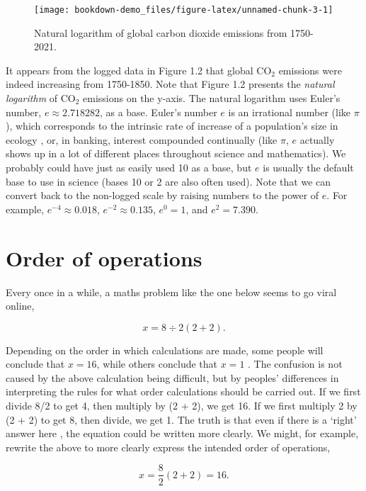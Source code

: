 \documentclass[
]{scrbook}
\begin{document}
\begin{figure}
\texttt{[image: bookdown-demo\_files/figure-latex/unnamed-chunk-3-1]} \caption{Natural logarithm of global carbon dioxide emissions from 1750-2021.}\label{fig:unnamed-chunk-3}
\end{figure}

It appears from the logged data in Figure 1.2 that global CO\(_{2}\) emissions were indeed increasing from 1750-1850.
Note that Figure 1.2 presents the \emph{natural logarithm} of CO\(_{2}\) emissions on the y-axis.
The natural logarithm uses Euler's number, \(e \approx 2.718282\), as a base.
Euler's number \(e\) is an irrational number (like \(\pi\)), which corresponds to the intrinsic rate of increase of a population's size in ecology \citep{Gotelli2001}, or, in banking, interest compounded continually (like \(\pi\), \(e\) actually shows up in a lot of different places throughout science and mathematics).
We probably could have just as easily used 10 as a base, but \(e\) is usually the default base to use in science (bases 10 or 2 are also often used).
Note that we can convert back to the non-logged scale by raising numbers to the power of \(e\).
For example, \(e^{-4} \approx 0.018\), \(e^{-2} \approx 0.135\), \(e^{0} = 1\), and \(e^{2} = 7.390\).

\hypertarget{order-of-operations}{%
\section{Order of operations}\label{order-of-operations}}

Every once in a while, a maths problem like the one below seems to go viral online,

\[x = 8 \div 2\left(2+2\right).\]

Depending on the order in which calculations are made, some people will conclude that \(x = 16\), while others conclude that \(x = 1\) \citep{Chernoff2022}.
The confusion is not caused by the above calculation being difficult, but by peoples' differences in interpreting the rules for what order calculations should be carried out.
If we first divide 8/2 to get 4, then multiply by (2 + 2), we get 16.
If we first multiply 2 by (2 + 2) to get 8, then divide, we get 1.
The truth is that even if there is a `right' answer here \citep{Chernoff2022}, the equation could be written more clearly.
We might, for example, rewrite the above to more clearly express the intended order of operations,

\[x = \frac{8}{2}\left(2 + 2\right) = 16.\]
\end{document}
